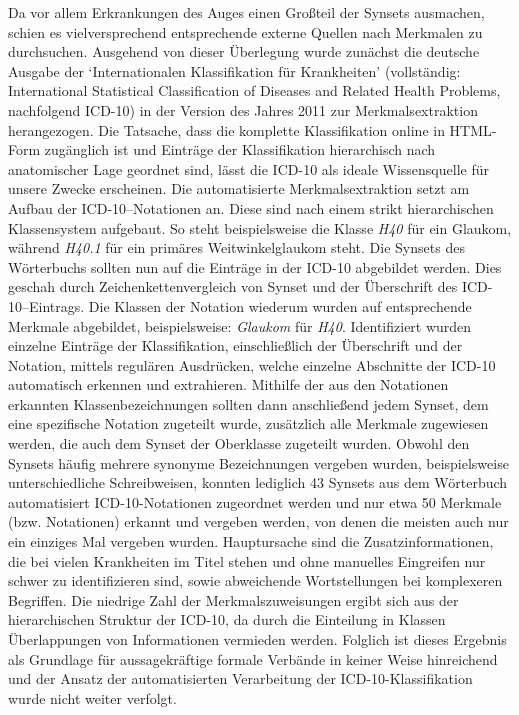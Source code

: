 \documentclass[pagesize,DIV=calc,12pt,draft]{scrreprt}
\begin{document}
Da vor allem Erkrankungen des Auges einen Großteil der Synsets ausmachen, schien es vielversprechend entsprechende externe Quellen nach Merkmalen zu durchsuchen. 
Ausgehend von dieser Überlegung wurde zunächst die deutsche Ausgabe der `Internationalen Klassifikation für Krankheiten' (vollständig: International Statistical Classification of Diseases and Related Health Problems, nachfolgend ICD-10) in der Version des Jahres 2011 zur Merkmalsextraktion herangezogen. 
Die Tatsache, dass die komplette Klassifikation online in HTML-Form zugänglich ist und Einträge der Klassifikation hierarchisch nach anatomischer Lage geordnet sind, lässt die ICD-10 als ideale Wissensquelle für unsere Zwecke erscheinen. 
Die automatisierte Merkmalsextraktion setzt am Aufbau der ICD-10--Notationen an. 
Diese sind nach einem strikt hierarchischen Klassensystem aufgebaut. 
So steht beispielsweise die Klasse \emph{H40} für ein Glaukom, während \emph{H40.1} für ein primäres Weitwinkelglaukom steht. 
Die Synsets des Wörterbuchs sollten nun auf die Einträge in der ICD-10 abgebildet werden. 
Dies geschah durch Zeichenkettenvergleich von Synset und der Überschrift des ICD-10--Eintrags. 
Die Klassen der Notation wiederum wurden auf entsprechende Merkmale abgebildet, beispielsweise: \emph{Glaukom} für \emph{H40}. 
Identifiziert wurden einzelne Einträge der Klassifikation, einschließlich der Überschrift und der Notation, mittels regulären Ausdrücken, welche einzelne Abschnitte der ICD-10 automatisch erkennen und extrahieren. 
Mithilfe der aus den Notationen erkannten Klassenbezeichnungen sollten dann anschließend jedem Synset, dem eine spezifische Notation zugeteilt wurde, zusätzlich alle Merkmale zugewiesen werden, die auch dem Synset der Oberklasse zugeteilt wurden. 
Obwohl den Synsets häufig mehrere synonyme Bezeichnungen vergeben wurden, beispielsweise unterschiedliche Schreibweisen, konnten lediglich 43 Synsets aus dem Wörterbuch automatisiert ICD-10-Notationen zugeordnet werden und nur etwa 50 Merkmale (bzw. Notationen) erkannt und vergeben werden, von denen die meisten auch nur ein einziges Mal vergeben wurden.  
Hauptursache sind die Zusatzinformationen, die bei vielen Krankheiten im Titel stehen und ohne manuelles Eingreifen nur schwer zu identifizieren sind, sowie abweichende Wortstellungen bei komplexeren Begriffen. 
Die niedrige Zahl der Merkmalszuweisungen ergibt sich aus der hierarchischen Struktur der ICD-10, da durch die Einteilung in Klassen Überlappungen von Informationen vermieden werden. 
Folglich ist dieses Ergebnis als Grundlage für aussagekräftige formale Verbände in keiner Weise hinreichend und der Ansatz der automatisierten Verarbeitung der ICD-10-Klassifikation wurde nicht weiter verfolgt. 
\end{document}

